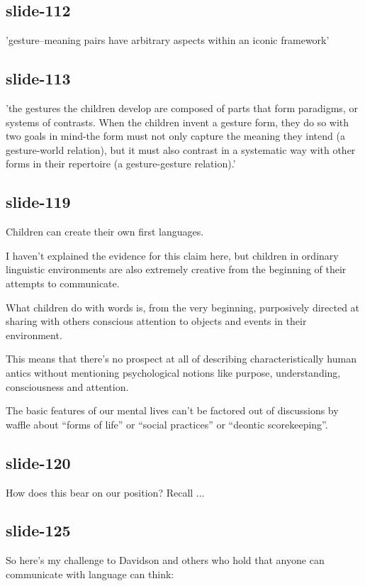 \documentclass[12pt,\papersize]{extarticle}
\begin{document}
\subsection{slide-112}
'gesture--meaning pairs have arbitrary aspects within an iconic framework'
 
\subsection{slide-113}
'the gestures the children develop are composed of parts that form paradigms, or systems of contrasts. When the children invent a gesture form, they do so with two goals in mind-the form must not only capture the meaning they intend (a gesture-world relation), but it must also contrast in a systematic way with other forms in their repertoire (a gesture-gesture relation).' \citep[p.\ 1389]{Goldin-Meadow:2002dq}
 
\subsection{slide-119}
Children can create their own first languages.
 
I haven't explained the evidence for this claim here, but children in ordinary linguistic environments are also extremely creative from the beginning of  their attempts to communicate.
 
What children do with words is, from the very beginning, purposively directed at sharing with others conscious attention to objects and events in their environment.
 
This means that there's no prospect at all of describing characteristically human antics without mentioning psychological notions like purpose, understanding, consciousness and attention.
 
The basic features of our mental lives can't be factored out of discussions by waffle about “forms of life” or “social practices” or “deontic scorekeeping”.
 
\subsection{slide-120}
How does this bear on our position?  Recall ...
 
\subsection{slide-125}
So here's my challenge to Davidson and others who hold that anyone can communicate with language can think:
 
\end{document}
